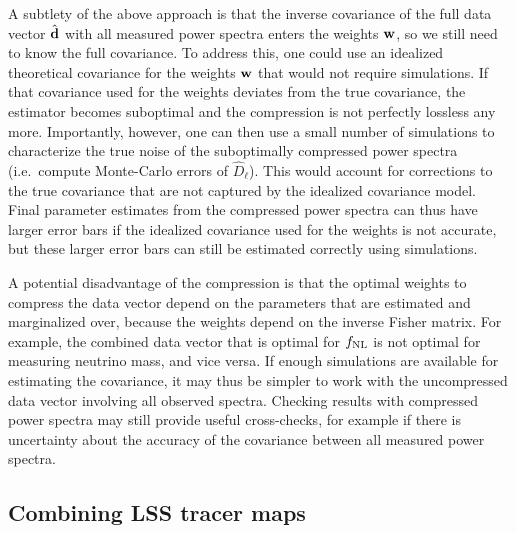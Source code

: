 \documentclass[prd,superscriptaddress,floatfix,notitlepage,nofootinbib,reprint]{revtex4-1} %
\begin{document}
A subtlety of the above approach is that the inverse covariance of the full data vector $\hat {\textbf{d}}$ with all measured power spectra enters the weights $\textbf{w}$, so we still need to know the full covariance.
To address this, one could use an idealized theoretical covariance for the weights $\textbf{w}$ that would not require simulations.
If that covariance used for the weights deviates from the true covariance, the estimator becomes suboptimal and the compression is not perfectly lossless any more.
Importantly, however, one can then use a small number of simulations to characterize the true noise of the suboptimally compressed power spectra (i.e.~compute Monte-Carlo errors of $\hat D_\ell$).
This would account for corrections to the true covariance that are not captured by the idealized covariance model.
Final parameter estimates from the compressed power spectra can thus have larger error bars if the idealized covariance used for the weights is not accurate, but these larger error bars can still be estimated correctly using simulations.


A potential disadvantage of the compression is that the optimal weights  to compress the data vector depend on the parameters that are estimated and marginalized over, because the weights depend on the inverse Fisher matrix.
For example, the combined data vector that is optimal for ${f_\mathrm{NL}}$ is not optimal for measuring neutrino mass, and vice versa.
If enough simulations are available for estimating the covariance, it may thus be simpler to work with the uncompressed data vector involving all observed spectra.
Checking results with  compressed power spectra may still provide useful cross-checks, for example if there is uncertainty about the accuracy of the covariance between all measured power spectra.





\subsection{Combining LSS tracer maps}
\end{document}
